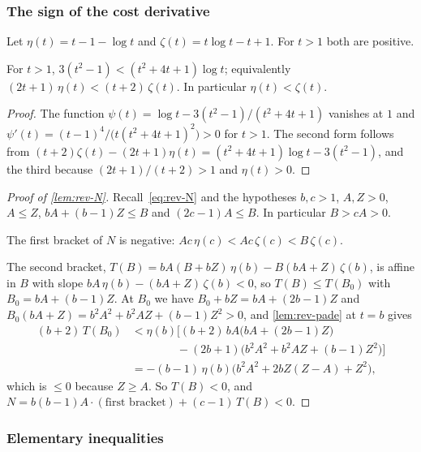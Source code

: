 \subsubsection{The sign of the cost derivative}\label{app:rev-N}

Let $\eta(t)=t-1-\log t$ and $\zeta(t)=t\log t-t+1$. For $t>1$ both are positive.

\begin{lemma}\label{lem:rev-pade}
For $t>1$, $3(t^2-1)<(t^2+4t+1)\log t$; equivalently $(2t+1)\,\eta(t)<(t+2)\,\zeta(t)$. In
particular $\eta(t)<\zeta(t)$.
\end{lemma}

\begin{proof}
The function $\psi(t)=\log t-3(t^2-1)/(t^2+4t+1)$ vanishes at $1$ and
$\psi'(t)=(t-1)^4/\bigl(t(t^2+4t+1)^2\bigr)>0$ for $t>1$. The second form follows from
$(t+2)\zeta(t)-(2t+1)\eta(t)=(t^2+4t+1)\log t-3(t^2-1)$, and the third because $(2t+1)/(t+2)>1$
and $\eta(t)>0$.
\end{proof}

\begin{proof}[Proof of \cref{lem:rev-N}]
Recall~\eqref{eq:rev-N} and the hypotheses $b,c>1$, $A,Z>0$, $A\le Z$, $bA+(b-1)Z\le B$ and
$(2c-1)A\le B$. In particular $B>cA>0$.

The first bracket of $N$ is negative: $Ac\,\eta(c)<Ac\,\zeta(c)<B\,\zeta(c)$.

The second bracket, $T(B)=bA(B+bZ)\,\eta(b)-B(bA+Z)\,\zeta(b)$, is affine in $B$ with slope
$bA\,\eta(b)-(bA+Z)\,\zeta(b)<0$, so $T(B)\le T(B_0)$ with $B_0=bA+(b-1)Z$. At $B_0$ we have
$B_0+bZ=bA+(2b-1)Z$ and $B_0(bA+Z)=b^2A^2+b^2AZ+(b-1)Z^2>0$, and \cref{lem:rev-pade} at $t=b$ gives
\begin{align*}
  (b+2)\,T(B_0)&<\eta(b)\bigl[(b+2)\,bA\bigl(bA+(2b-1)Z\bigr)\\
  &\qquad\qquad-(2b+1)\bigl(b^2A^2+b^2AZ+(b-1)Z^2\bigr)\bigr]\\
  &=-(b-1)\,\eta(b)\bigl(b^2A^2+2bZ(Z-A)+Z^2\bigr),
\end{align*}
which is $\le0$ because $Z\ge A$. So $T(B)<0$, and
$N=b(b-1)A\cdot(\text{first bracket})+(c-1)\,T(B)<0$.
\end{proof}

\subsubsection{Elementary inequalities}\label{app:rev-elementary}


